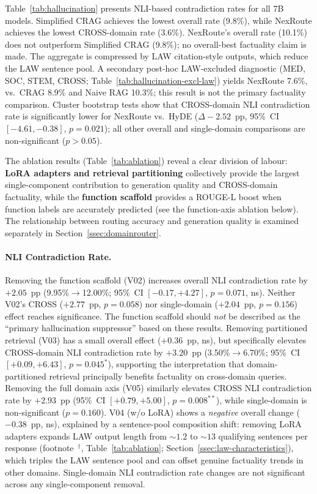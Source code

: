 \documentclass[a4paper,fleql,doubleblind]{cas-sc}
\begin{document}
Table~\ref{tab:hallucination} presents NLI-based contradiction rates for all 7B models.
Simplified CRAG achieves the lowest overall rate (9.8\%), while NexRoute achieves the
lowest CROSS-domain rate (3.6\%).
NexRoute's overall rate (10.1\%) does not outperform Simplified CRAG (9.8\%);
no overall-best factuality claim is made.
The aggregate is compressed by LAW citation-style outputs, which reduce the LAW sentence pool.
A secondary post-hoc LAW-excluded diagnostic (MED, SOC, STEM, CROSS;
Table~\ref{tab:hallucination-excl-law}) yields NexRoute 7.6\%, vs.\ CRAG 8.9\%
and Naive RAG 10.3\%; this result is not the primary factuality comparison.
Cluster bootstrap tests show that CROSS-domain NLI contradiction rate is significantly lower
for NexRoute vs.\ HyDE ($\Delta{-}2.52$~pp, 95\%~CI $[-4.61,{-}0.38]$, $p{=}0.021$);
all other overall and single-domain comparisons are non-significant ($p{>}0.05$).

The ablation results (Table~\ref{tab:ablation}) reveal a clear division of labour:
\textbf{LoRA adapters and retrieval partitioning} collectively provide the largest
single-component contribution to generation quality and CROSS-domain factuality,
while the \textbf{function scaffold} provides a ROUGE-L boost when function labels are
accurately predicted (see the function-axis ablation below).
The relationship between routing accuracy and generation quality is examined
separately in Section~\ref{ssec:domainrouter}.

\paragraph{NLI Contradiction Rate.}
Removing the function scaffold (V02) increases overall NLI contradiction rate by $+2.05$~pp
(9.95\%$\to$12.00\%; 95\%~CI $[-0.17,{+}4.27]$, $p{=}0.071$, \textsf{ns}).
Neither V02's CROSS ($+2.77$~pp, $p{=}0.058$) nor single-domain ($+2.04$~pp,
$p{=}0.156$) effect reaches significance.
The function scaffold should \emph{not} be described as the ``primary hallucination
suppressor'' based on these results.
Removing partitioned retrieval (V03) has a small overall effect ($+0.36$~pp, \textsf{ns}),
but specifically elevates CROSS-domain NLI contradiction rate by $+3.20$~pp
(3.50\%$\to$6.70\%; 95\%~CI $[{+}0.09,{+}6.43]$, $p{=}0.045^{*}$), supporting
the interpretation that domain-partitioned retrieval principally benefits factuality
on cross-domain queries.
Removing the full domain axis (V05) similarly elevates CROSS NLI contradiction rate
by $+2.93$~pp (95\%~CI $[{+}0.79,{+}5.00]$, $p{=}0.008^{**}$), while single-domain
is non-significant ($p{=}0.160$).
V04 (w/o LoRA) shows a \textit{negative} overall change ($-0.38$~pp, \textsf{ns}),
explained by a sentence-pool composition shift: removing LoRA adapters expands LAW output
length from ${\sim}1.2$ to ${\sim}13$ qualifying sentences per response
(footnote~$^\dagger$, Table~\ref{tab:ablation}; Section~\ref{ssec:law-characteristics}),
which triples the LAW sentence pool and can offset genuine factuality trends in other domains.
Single-domain NLI contradiction rate changes are not significant across any single-component removal.
\end{document}
